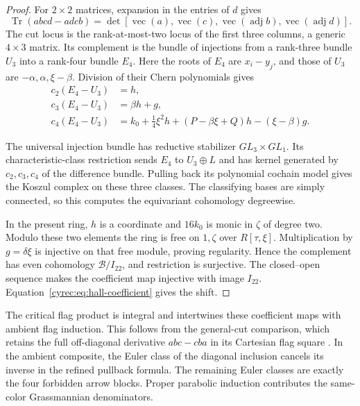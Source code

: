 \begin{proof}
For $2\times2$ matrices, expansion in the entries of $d$ gives
\[
 \operatorname{Tr}(abcd-adcb)
 =\det[\operatorname{vec}(a),\operatorname{vec}(c),
               \operatorname{vec}(\operatorname{adj}b),
               \operatorname{vec}(\operatorname{adj}d)].
\]
The cut locus is the rank-at-most-two locus of the first three
columns, a generic $4\times3$ matrix. Its complement is the
bundle of injections from a rank-three bundle $U_3$ into a
rank-four bundle $E_4$. Here the roots of $E_4$ are $x_i-y_j$,
and those of $U_3$ are $-\alpha,\alpha,\xi-\beta$.
Division of their Chern polynomials gives
\begin{align*}
 c_2(E_4-U_3)&=h,\\
 c_3(E_4-U_3)&=\beta h+g,\\
 c_4(E_4-U_3)&=k_0+\tfrac14\xi^2h
                   +(P-\beta\xi+Q)h-(\xi-\beta)g.
\end{align*}

The universal injection bundle has reductive stabilizer
$GL_3\times GL_1$. Its characteristic-class restriction sends
$E_4$ to $U_3\oplus L$ and has kernel generated by
$c_2,c_3,c_4$ of the difference bundle.
Pulling back its polynomial cochain model gives the Koszul
complex on these three classes. The classifying bases are simply
connected, so this computes the equivariant cohomology degreewise.

In the present ring, $h$ is a coordinate and $16k_0$ is monic
in $\zeta$ of degree two. Modulo these two elements the ring is
free on $1,\zeta$ over $R[\tau,\xi]$. Multiplication by
$g=\delta\xi$ is injective on that free module, proving
regularity. Hence the complement has even cohomology
$\mathscr B/I_{22}$, and restriction is surjective.
The closed--open sequence makes the coefficient map injective
with image $I_{22}$. Equation~\eqref{cyrec:eq:hall-coefficient}
gives the shift.
\end{proof}

The critical flag product is integral and intertwines these
coefficient maps with ambient flag induction. This follows from
the general-cut comparison, which retains the full off-diagonal
derivative $abc-cba$ in its Cartesian flag square
\cite[Appendix~A, Theorem~A.2]{YangZhaoGeneralCut}.
In the ambient composite, the Euler class of the diagonal
inclusion cancels its inverse in the refined pullback formula.
The remaining Euler classes are exactly the four forbidden arrow
blocks. Proper parabolic induction contributes the same-color
Grassmannian denominators.

